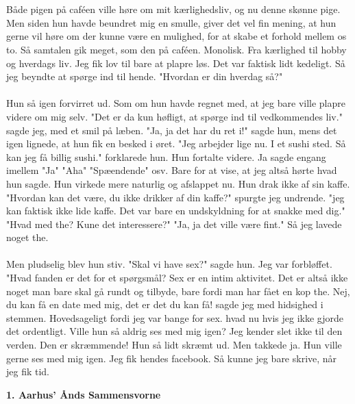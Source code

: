 \documentclass[]{article}
\begin{document}
\\ \\
Både pigen på caféen ville høre om mit kærlighedsliv, og nu denne skønne pige. Men siden hun havde beundret mig en smulle, giver det vel fin mening, at hun gerne vil høre om der kunne være en mulighed, for at skabe et forhold mellem os to. Så samtalen gik meget, som den på caféen. Monolisk. Fra kærlighed til hobby og hverdags liv. Jeg fik lov til bare at plapre løs. Det var faktisk lidt kedeligt. Så jeg beyndte at spørge ind til hende. "Hvordan er din hverdag så?" 
\\ \\
Hun så igen forvirret ud. Som om hun havde regnet med, at jeg bare ville plapre videre om mig selv. "Det er da kun høfligt, at spørge ind til vedkommendes liv." sagde jeg, med et smil på læben. "Ja, ja det har du ret i!" sagde hun, mens det igen lignede, at hun fik en besked i øret. "Jeg arbejder lige nu. I et sushi sted. Så kan jeg få billig sushi." forklarede hun. Hun fortalte videre. Ja sagde engang imellem "Ja" "Aha" "Spæendende" osv. Bare for at vise, at jeg altså hørte hvad hun sagde. Hun virkede mere naturlig og afslappet nu. Hun drak ikke af sin kaffe. "Hvordan kan det være, du ikke drikker af din kaffe?" spurgte jeg undrende. "jeg kan faktisk ikke lide kaffe. Det var bare en undskyldning for at snakke med dig." "Hvad med the? Kune det interessere?" "Ja, ja det ville være fint." Så jeg lavede noget the.
\\ \\
Men pludselig blev hun stiv. "Skal vi have sex?" sagde hun. Jeg var forbløffet. "Hvad fanden er det for et spørgsmål? Sex er en intim aktivitet. Det er altså ikke noget man bare skal gå rundt og tilbyde, bare fordi man har fået en kop the. Nej, du kan få en date med mig, det er det du kan få! sagde jeg med hidsighed i stemmen. Hovedsageligt fordi jeg var bange for sex. hvad nu hvis jeg ikke gjorde det ordentligt. Ville hun så aldrig ses med mig igen? Jeg kender slet ikke til den verden. Den er skræmmende! Hun så lidt skræmt ud. Men takkede ja. Hun ville gerne ses med mig igen. Jeg fik hendes facebook. Så kunne jeg bare skrive, når jeg fik tid. 

\begin{center}
	\large\textbf{1. Aarhus' Ånds Sammensvorne}
\end{center}
\end{document}
